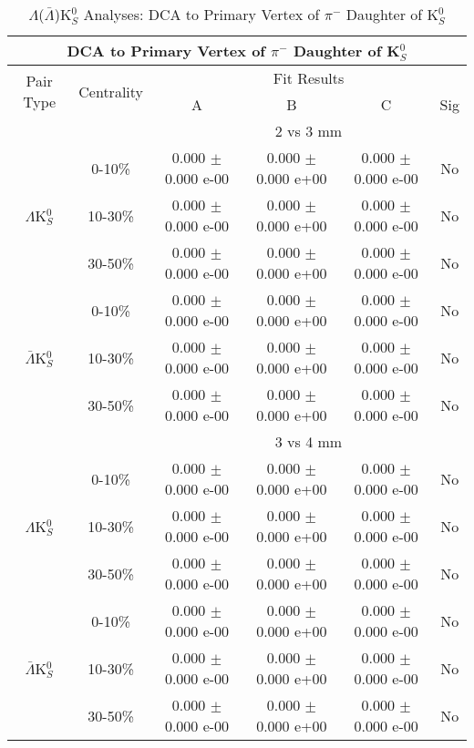 \documentclass[../AnalysisNoteJBuxton.tex]{subfiles}
\begin{document}
\begin{table}
 \centering
 \begin{tabular}{|c|c|c|c|c|c|}
  \multicolumn{6}{c}{DCA to Primary Vertex of $\pi^{-}$ Daughter of K$^{0}_{S}$} \\
  \hline
  \multirow{2}{*}{Pair Type} & \multirow{2}{*}{Centrality} & \multicolumn{4}{c|}{Fit Results} \\
  \cline{3-6}
   & & A & B & C & Sig \\  
  \hline
  \multicolumn{2}{|c}{} & \multicolumn{4}{c|}{2 vs 3 mm} \\  
  \hline  
  \multirow{3}{*}{$\Lambda$K$^{0}_{S}$}
   &  0-10\% & 0.000 $\pm$ 0.000 e-00 & 0.000 $\pm$ 0.000 e+00 & 0.000 $\pm$ 0.000 e-00 & No \\
   & 10-30\% & 0.000 $\pm$ 0.000 e-00 & 0.000 $\pm$ 0.000 e+00 & 0.000 $\pm$ 0.000 e-00 & No \\
   & 30-50\% & 0.000 $\pm$ 0.000 e-00 & 0.000 $\pm$ 0.000 e+00 & 0.000 $\pm$ 0.000 e-00 & No \\
  \hline
  \multirow{3}{*}{$\bar{\Lambda}$K$^{0}_{S}$}  
   &  0-10\% & 0.000 $\pm$ 0.000 e-00 & 0.000 $\pm$ 0.000 e+00 & 0.000 $\pm$ 0.000 e-00 & No \\
   & 10-30\% & 0.000 $\pm$ 0.000 e-00 & 0.000 $\pm$ 0.000 e+00 & 0.000 $\pm$ 0.000 e-00 & No \\
   & 30-50\% & 0.000 $\pm$ 0.000 e-00 & 0.000 $\pm$ 0.000 e+00 & 0.000 $\pm$ 0.000 e-00 & No \\
  \hline 
  \multicolumn{2}{|c}{} & \multicolumn{4}{c|}{3 vs 4 mm} \\
  \hline  
  \multirow{3}{*}{$\Lambda$K$^{0}_{S}$}   
   &  0-10\% & 0.000 $\pm$ 0.000 e-00 & 0.000 $\pm$ 0.000 e+00 & 0.000 $\pm$ 0.000 e-00 & No \\
   & 10-30\% & 0.000 $\pm$ 0.000 e-00 & 0.000 $\pm$ 0.000 e+00 & 0.000 $\pm$ 0.000 e-00 & No \\
   & 30-50\% & 0.000 $\pm$ 0.000 e-00 & 0.000 $\pm$ 0.000 e+00 & 0.000 $\pm$ 0.000 e-00 & No \\
  \hline  
  \multirow{3}{*}{$\bar{\Lambda}$K$^{0}_{S}$}
   & 0-10\% & 0.000 $\pm$ 0.000 e-00 & 0.000 $\pm$ 0.000 e+00 & 0.000 $\pm$ 0.000 e-00 & No \\
   & 10-30\% & 0.000 $\pm$ 0.000 e-00 & 0.000 $\pm$ 0.000 e+00 & 0.000 $\pm$ 0.000 e-00 & No \\
   & 30-50\% & 0.000 $\pm$ 0.000 e-00 & 0.000 $\pm$ 0.000 e+00 & 0.000 $\pm$ 0.000 e-00 & No \\
  \hline
 \end{tabular}
 \caption{$\Lambda$($\bar{\Lambda}$)K$^{0}_{S}$ Analyses: DCA to Primary Vertex of $\pi^{-}$ Daughter of K$^{0}_{S}$}
 \label{tab:DcaToPrimVertexNegPionDaughtOfK0LamK0Full}
\end{table}
\end{document}
